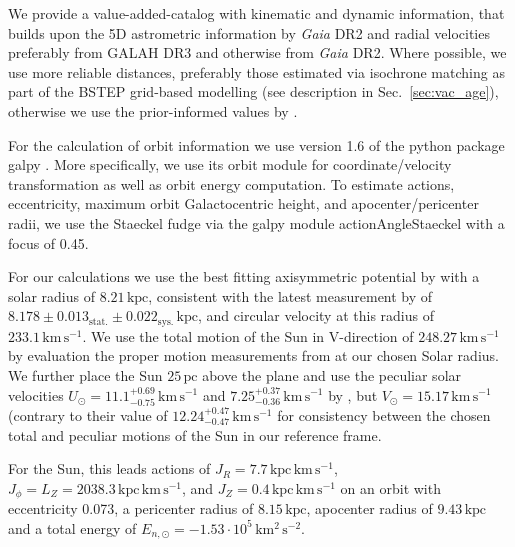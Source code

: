 \documentclass[fleqn,usenatbib,useAMS]{mnras}
\newcommand{\Gaia}{\textit{Gaia}\xspace}
\begin{document}
We provide a value-added-catalog with kinematic and dynamic information, that builds upon the 5D astrometric information by \Gaia DR2 and radial velocities preferably from GALAH DR3 and otherwise from \Gaia DR2. Where possible, we use more reliable distances, preferably those estimated via isochrone matching as part of the BSTEP grid-based modelling (see description in Sec.~\ref{sec:vac_age}), otherwise we use the prior-informed values by \citet{BailerJones2018}.

For the calculation of orbit information we use version 1.6 of the python package {\sc galpy} \citep{Bovy2015}. More specifically, we use its {\sc orbit} module for coordinate/velocity transformation as well as orbit energy computation. To estimate actions, eccentricity, maximum orbit Galactocentric height, and apocenter/pericenter radii, we use the Staeckel fudge via the {\sc galpy} module {\sc actionAngleStaeckel} with a focus of 0.45.

For our calculations we use the best fitting axisymmetric potential by \citet{McMillan2017} with a solar radius of $8.21\,\mathrm{kpc}$, consistent with the latest measurement by \citet{Abuter2019} of $8.178 \pm 0.013_\text{stat.} \pm 0.022_\text{sys.}\,\mathrm{kpc}$, and circular velocity at this radius of $233.1\,\mathrm{km\,s^{-1}}$. We use the total motion of the Sun in V-direction of $248.27\,\mathrm{km\,s^{-1}}$ by evaluation the proper motion measurements from \citet{Reid2004} at our chosen Solar radius. We further place the Sun $25\,\mathrm{pc}$ above the plane \citep{Juric2008} and use the peculiar solar velocities $U_\odot = 11.1_{-0.75}^{+0.69}\,\mathrm{km\,s^{-1}}$ and $7.25_{-0.36}^{+0.37}\,\mathrm{km\,s^{-1}}$ by \citet{Schoenrich2010}, but $V_\odot = 15.17\,\mathrm{km\,s^{-1}}$ (contrary to their value of $12.24_{-0.47}^{+0.47}\,\mathrm{km\,s^{-1}}$ for consistency between the chosen total and peculiar motions of the Sun in our reference frame. 

For the Sun, this leads actions of $J_R = 7.7\,\mathrm{kpc\,km\,s^{-1}}$, $J_\phi = L_Z = 2038.3\,\mathrm{kpc\,km\,s^{-1}}$, and $J_Z = 0.4\,\mathrm{kpc\,km\,s^{-1}}$ on an orbit with eccentricity 0.073, a pericenter radius of $8.15\,\mathrm{kpc}$, apocenter radius of $9.43\,\mathrm{kpc}$ and a total energy of $E_{n,\odot} = -1.53\cdot 10^5\,\mathrm{km^2\,s^{-2}}$.
\end{document}
